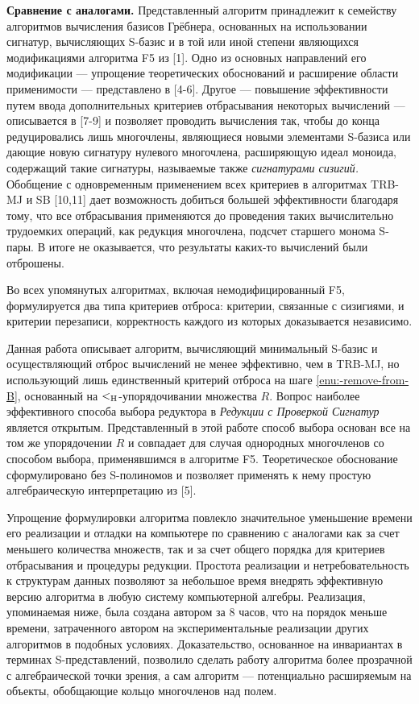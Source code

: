 \documentclass[russian,11pt,twoside]{article}
\begin{document}
\textbf{Сравнение с аналогами.} Представленный алгоритм принадлежит
к семейству алгоритмов вычисления базисов Грёбнера, основанных на
использовании сигнатур, вычисляющих S-базис и в той или иной степени
являющихся модификациями алгоритма F5 из {[}1{]}. Одно из основных
направлений его модификации --- упрощение теоретических обоснований
и расширение области применимости --- представлено в {[}4-6{]}. Другое
--- повышение эффективности путем ввода дополнительных критериев отбрасывания
некоторых вычислений --- описывается в {[}7-9{]} и позволяет проводить
вычисления так, чтобы до конца редуцировались лишь многочлены, являющиеся
новыми элементами S-базиса или дающие новую сигнатуру нулевого многочлена,
расширяющую идеал моноида, содержащий такие сигнатуры, называемые
также \emph{сигнатурами сизигий.} Обобщение с одновременным применением
всех критериев в алгоритмах TRB-MJ и SB {[}10,11{]} дает возможность
добиться большей эффективности благодаря тому, что все отбрасывания
применяются до проведения таких вычислительно трудоемких операций,
как редукция многочлена, подсчет старшего монома S-пары. В итоге не
оказывается, что результаты каких-то вычислений были отброшены.

Во всех упомянутых алгоритмах, включая немодифицированный F5, формулируется
два типа критериев отброса: критерии, связанные с сизигиями, и критерии
перезаписи, корректность каждого из которых доказывается независимо.

Данная работа описывает алгоритм, вычисляющий минимальный S-базис
и осуществляющий отброс вычислений не менее эффективно, чем в TRB-MJ,
но использующий лишь единственный критерий отброса на шаге \ref{enu:-remove-from-B},
основанный на $<_{\text{H}}$-упорядочивании множества $R$. Вопрос наиболее
эффективного способа выбора редуктора в \emph{Редукции с Проверкой
Сигнатур} является открытым. Представленный в этой работе способ выбора
основан все на том же упорядочении $R$ и совпадает для случая однородных
многочленов со способом выбора, применявшимся в алгоритме F5. Теоретическое
обоснование сформулировано без S-полиномов и позволяет применять к
нему простую алгебраическую интерпретацию из {[}5{]}.

Упрощение формулировки алгоритма повлекло значительное уменьшение
времени его реализации и отладки на компьютере по сравнению с аналогами
как за счет меньшего количества множеств, так и за счет общего порядка
для критериев отбрасывания и процедуры редукции. Простота реализации
и нетребовательность к структурам данных позволяют за небольшое время
внедрять эффективную версию алгоритма в любую систему компьютерной
алгебры. Реализация, упоминаемая ниже, была создана автором за 8 часов,
что на порядок меньше времени, затраченного автором на экспериментальные
реализации других алгоритмов в подобных условиях. Доказательство,
основанное на инвариантах в терминах S-представлений, позволило сделать
работу алгоритма более прозрачной с алгебраической точки зрения, а
сам алгоритм --- потенциально расширяемым на объекты, обобщающие кольцо
многочленов над полем.
\end{document}
